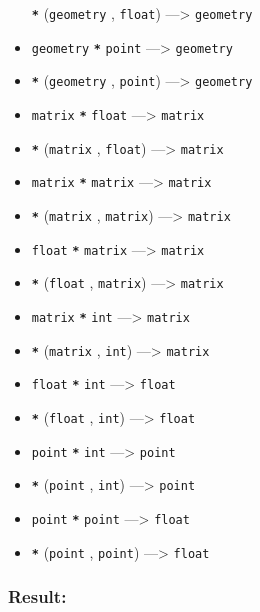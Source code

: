 \documentclass[]{book}
\theoremstyle{definition}
\theoremstyle{definition}
\theoremstyle{definition}
\theoremstyle{remark}
\begin{document}
\begin{itemize}
  \textbf{\texttt{*}} (\texttt{geometry} , \texttt{float})
  ---\textgreater{} \texttt{geometry}
\item
  \texttt{geometry} \textbf{\texttt{*}} \texttt{point} ---\textgreater{}
  \texttt{geometry}
\item
  \textbf{\texttt{*}} (\texttt{geometry} , \texttt{point})
  ---\textgreater{} \texttt{geometry}
\item
  \texttt{matrix} \textbf{\texttt{*}} \texttt{float} ---\textgreater{}
  \texttt{matrix}
\item
  \textbf{\texttt{*}} (\texttt{matrix} , \texttt{float})
  ---\textgreater{} \texttt{matrix}
\item
  \texttt{matrix} \textbf{\texttt{*}} \texttt{matrix} ---\textgreater{}
  \texttt{matrix}
\item
  \textbf{\texttt{*}} (\texttt{matrix} , \texttt{matrix})
  ---\textgreater{} \texttt{matrix}
\item
  \texttt{float} \textbf{\texttt{*}} \texttt{matrix} ---\textgreater{}
  \texttt{matrix}
\item
  \textbf{\texttt{*}} (\texttt{float} , \texttt{matrix})
  ---\textgreater{} \texttt{matrix}
\item
  \texttt{matrix} \textbf{\texttt{*}} \texttt{int} ---\textgreater{}
  \texttt{matrix}
\item
  \textbf{\texttt{*}} (\texttt{matrix} , \texttt{int}) ---\textgreater{}
  \texttt{matrix}
\item
  \texttt{float} \textbf{\texttt{*}} \texttt{int} ---\textgreater{}
  \texttt{float}
\item
  \textbf{\texttt{*}} (\texttt{float} , \texttt{int}) ---\textgreater{}
  \texttt{float}
\item
  \texttt{point} \textbf{\texttt{*}} \texttt{int} ---\textgreater{}
  \texttt{point}
\item
  \textbf{\texttt{*}} (\texttt{point} , \texttt{int}) ---\textgreater{}
  \texttt{point}
\item
  \texttt{point} \textbf{\texttt{*}} \texttt{point} ---\textgreater{}
  \texttt{float}
\item
  \textbf{\texttt{*}} (\texttt{point} , \texttt{point})
  ---\textgreater{} \texttt{float}
\end{itemize}

\subsubsection{Result:}\label{result-8}
\end{document}
